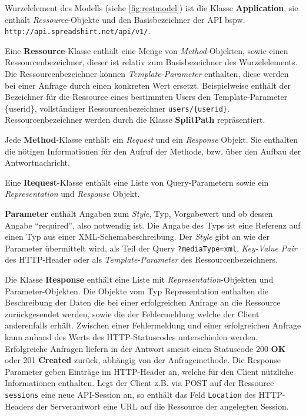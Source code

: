 Wurzelelement des Modells (siehe \cref{fig:restmodel}) ist die Klasse \textbf{Application}, sie enthält \emph{Ressource}-Objekte und den Basisbezeichner der API bspw. \texttt{\small http://api.spreadshirt.net/api/v1/}. 

Eine \textbf{Ressource}-Klasse enthält eine Menge von \emph{Method}-Objekten, sowie einen Ressourcenbezeichner, dieser ist relativ zum Basisbezeichner des Wurzelelements. Die Ressourcenbezeichner können \emph{Template-Parameter} enthalten, diese werden bei einer Anfrage durch einen konkreten Wert ersetzt. Beispielweise enthält der Bezeichner für die Ressource eines bestimmten Users den Template-Parameter \{userid\}, vollständiger Ressourcenbezeichner \texttt{users/\{userid\}}. Ressourcenbezeichner werden durch die Klasse \textbf{SplitPath} repräsentiert. 

Jede \textbf{Method}-Klasse enthält ein \emph{Request} und ein \emph{Response} Objekt. Sie enthalten die nötigen Informationen für den Aufruf der Methode, bzw. über den Aufbau der Antwortnachricht.

Eine \textbf{Request}-Klasse enthält eine Liste von Query-Parametern sowie ein \emph{Representation} und \emph{Response} Objekt.

\textbf{Parameter} enthält Angaben zum \emph{Style}, Typ, Vorgabewert und ob dessen Angabe \enquote{required}, also notwendig ist. Die Angabe des Typs ist eine Referenz auf einen Typ aus einer XML-Schemabeschreibung. Der \emph{Style} gibt an wie der Parameter übermittelt wird, als Teil der Query \texttt{?mediaType=xml}, \emph{Key-Value Pair} des HTTP-Header oder als \emph{Template-Parameter} des Ressourcenbezeichners. 

Die Klasse \textbf{Response} enthält eine Liste mit \emph{Representation}-Objekten und Parameter-Objekten. Die Objekte vom Typ Representation enthalten die Beschreibung der Daten die bei einer erfolgreichen Anfrage an die Ressource zurückgesendet werden, sowie die der Fehlermeldung welche der Client anderenfalls erhält. Zwischen einer Fehlermeldung und einer erfolgreichen Anfrage kann anhand des Werts des HTTP-Statuscodes unterschieden werden. Erfolgreiche Anfragen liefern in der Antwort smeist einen Statuscode 200 \textbf{OK} oder 201 \textbf{Created} zurück, abhängig von der Anfragemethode. Die Response Parameter geben Einträge im HTTP-Header an, welche für den Client nützliche Informationen enthalten. Legt der Client z.B. via POST auf der Ressource \texttt{sessions} eine neue API-Session an, so enthält das Feld \texttt{Location} des HTTP-Headers der Serverantwort eine URL auf die Ressource der angelegten Session.

